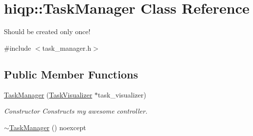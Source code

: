 \hypertarget{classhiqp_1_1TaskManager}{\section{hiqp\-:\-:Task\-Manager Class Reference}
\label{classhiqp_1_1TaskManager}
}


Should be created only once!  




{\ttfamily \#include $<$task\-\_\-manager.\-h$>$}

\subsection*{Public Member Functions}
\begin{DoxyCompactItemize}
\item 
\hypertarget{classhiqp_1_1TaskManager_af3ca4a5c83b5edb21acb10b79545941e}{\hyperlink{classhiqp_1_1TaskManager_af3ca4a5c83b5edb21acb10b79545941e}{Task\-Manager} (\hyperlink{classhiqp_1_1TaskVisualizer}{Task\-Visualizer} $\ast$task\-\_\-visualizer)}\label{classhiqp_1_1TaskManager_af3ca4a5c83b5edb21acb10b79545941e}

\begin{DoxyCompactList}\small\item\em Constructor Constructs my awesome controller. \end{DoxyCompactList}\item 
\hypertarget{classhiqp_1_1TaskManager_a688ad548e2ef681b458c1fc90326f6e6}{\hyperlink{classhiqp_1_1TaskManager_a688ad548e2ef681b458c1fc90326f6e6}{$\sim$\-Task\-Manager} () noexcept}\label{classhiqp_1_1TaskManager_a688ad548e2ef681b458c1fc90326f6e6}


\end{DoxyCompactItemize}
